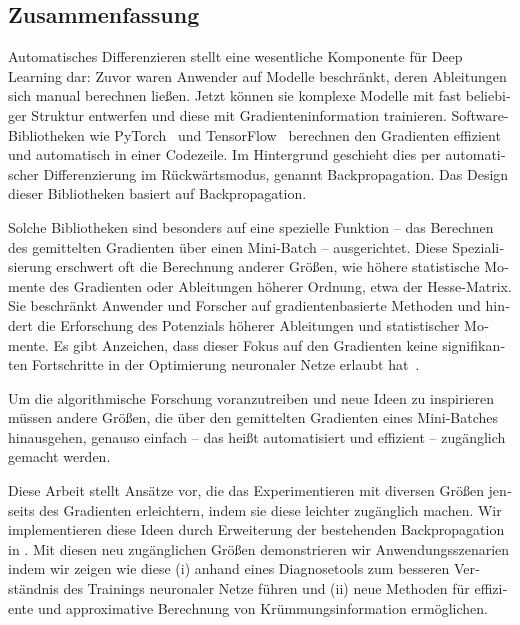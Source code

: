 
\begin{otherlanguage}{german}
  \chapter{Zusammenfassung}

  Automatisches Differenzieren stellt eine wesentliche Komponente f\"ur Deep
  Learning dar: Zuvor waren Anwender auf Modelle beschr\"ankt, deren Ableitungen
  sich manual berechnen lie\ss{}en. Jetzt k\"onnen sie komplexe Modelle mit fast
  beliebiger Struktur entwerfen und diese mit Gradienteninformation trainieren.
  Software-Bibliotheken wie PyTorch~\cite{paszke2019pytorch} und
  TensorFlow~\cite{abadi2016tensorflow} berechnen den Gradienten effizient und
  automatisch in einer Codezeile. Im Hintergrund geschieht dies per
  automatischer Differenzierung im R\"uckw\"artsmodus, genannt Backpropagation.
  Das Design dieser Bibliotheken basiert auf Backpropagation.

  Solche Bibliotheken sind besonders auf eine spezielle Funktion -- das
  Berechnen des gemittelten Gradienten \"uber einen Mini-Batch -- ausgerichtet.
  Diese Spezialisierung erschwert oft die Berechnung anderer Gr\"o\ss{}en, wie
  höhere statistische Momente des Gradienten oder Ableitungen höherer Ordnung,
  etwa der Hesse-Matrix. Sie beschr\"ankt Anwender und Forscher auf
  gradientenbasierte Methoden und hindert die Erforschung des Potenzials
  h\"oherer Ableitungen und statistischer Momente. Es gibt Anzeichen, dass
  dieser Fokus auf den Gradienten keine signifikanten Fortschritte in der
  Optimierung neuronaler Netze erlaubt hat~\cite{schmidt2021descending}.

  Um die algorithmische Forschung voranzutreiben und neue Ideen zu inspirieren
  müssen andere Gr\"o\ss{}en, die über den gemittelten Gradienten eines
  Mini-Batches hinausgehen, genauso einfach -- das hei\ss{}t automatisiert und
  effizient -- zug\"anglich gemacht werden.

  Diese Arbeit stellt Ans\"atze vor, die das Experimentieren mit diversen
  Gr\"o\ss{}en jenseits des Gradienten erleichtern, indem sie diese leichter
  zug\"anglich machen. Wir implementieren diese Ideen durch Erweiterung der
  bestehenden Backpropagation in \pytorch. Mit diesen neu zug\"anglichen
  Gr\"o\ss{}en demonstrieren wir Anwendungsszenarien indem wir zeigen wie diese
  (i) anhand eines Diagnosetools zum besseren Verst\"andnis des Trainings
  neuronaler Netze f\"uhren und (ii) neue Methoden f\"ur effiziente und
  approximative Berechnung von Kr\"ummungsinformation erm\"oglichen.


\end{otherlanguage}
